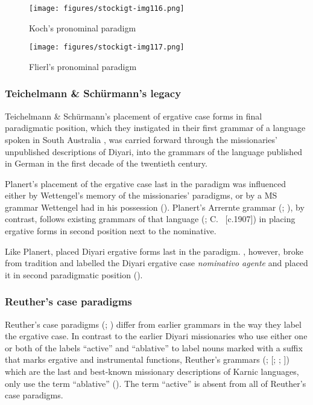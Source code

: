 \begin{figure}
\texttt{[image: figures/stockigt-img116.png]}
\caption{Koch’s pronominal paradigm \citeyearpar{koch_untitled_1868}}
\label{bkm:Ref449368589}\label{fig:key:167}
\end{figure}

\begin{figure}
\texttt{[image: figures/stockigt-img117.png]}
\caption{Flierl’s pronominal paradigm \citeyearpar[18--19]{flierl_christianieli_1880}}
\label{bkm:Ref449368610}\label{fig:key:168}
\end{figure}

\subsubsection{Teichelmann \& Schürmann’s legacy}
\label{sec:key:8.5.2.2}

Teichelmann \& Schürmann’s placement of ergative case forms in final paradigmatic position, which they instigated in their first grammar of a language spoken in South Australia \citeyearpar{teichelmann_outlines_1840}, was carried forward through the missionaries' unpublished descriptions of Diyari, into the grammars of the language published in German in the first decade of the twentieth century.

Planert’s placement of the ergative case last in the paradigm was influenced either by Wettengel’s memory of the missionaries' paradigms, or by a MS grammar Wettengel had in his possession (). Planert’s Arrernte grammar (\citeyear*{planert_australische_1907}; ), by contrast, follows existing grammars of that language (\citealt{kempe_grammar_1891}; C. \citealt{strehlow_untitled_1931}~[c.1907]) in placing ergative forms in second position next to the nominative.

Like Planert, \citet[94]{eylmann_eingeborenen_1908} placed Diyari ergative forms last in the paradigm. \citet[58--65]{gatti_lingua_1930}, however, broke from tradition and labelled the Diyari ergative case \textit{nominativo agente} and placed it in second paradigmatic position ().

\subsubsection{Reuther’s case paradigms}
\label{sec:key:8.5.2.3}\label{bkm:Ref326948719}

Reuther’s case paradigms (\citeyear{reuther_dieri_1894}; \citeyear{reuther_reuther_1899}) differ from earlier grammars in the way they label the ergative case. In contrast to the earlier Diyari missionaries who use either one or both of the labels “active” and “ablative” to label nouns marked with a suffix that marks ergative and instrumental functions, Reuther’s grammars (\citeyear{reuther_dieri_1894}; \citeyear{reuther_three_1981} [\citeyear{reuther_reuther_1899}; \citeyear{reuther_repr_1899}; \citeyear{reuther_ms_1901}]) which are the last and best-known missionary descriptions of Karnic languages, only use the term “ablative” (). The term “active” is absent from all of Reuther’s case paradigms.


